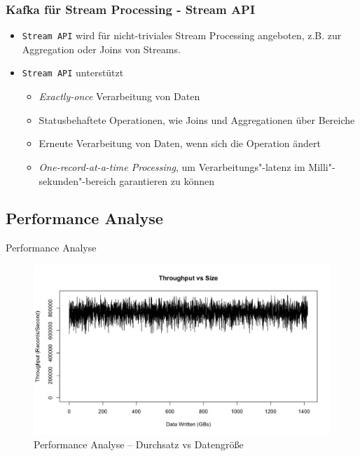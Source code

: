 \begin{frame}
\frametitle{Kafka für Stream Processing - Stream API}

\begin{itemize}
	\item \texttt{Stream API} wird für nicht-triviales Stream Processing angeboten,
	z.B. zur Aggregation oder Joins von Streams. 
	\item \texttt{Stream API} unterstützt
	\begin{itemize}
		\item \textit{Exactly-once} Verarbeitung von Daten
		\item Statusbehaftete Operationen, wie Joins und Aggregationen über Bereiche
		\item Erneute Verarbeitung von Daten, wenn sich die Operation ändert
		\item \textit{One-record-at-a-time Processing}, um Verarbeitungs"-latenz im Milli"-sekunden"-bereich garantieren zu können
	\end{itemize}
\end{itemize}

\end{frame}

\subsection{Performance Analyse}
\begin{frame}{Performance Analyse}
\begin{figure}
	\centering
	\includegraphics[scale=0.2]{figure/throughput_vs_size_0.png}
	\caption{Performance Analyse -- Durchsatz vs Datengröße~\cite{KafkaPerf}}
\end{figure}

	\pnote{}
\end{frame}

